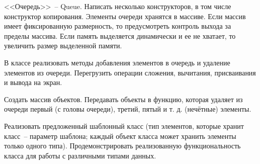 
<<Очередь>>~-- Queue. Написать несколько конструкторов, в том числе конструктор
копирования. Элементы очереди хранятся в массиве. Если массив имеет фиксированную
размерность, то предусмотреть контроль выхода за пределы массива. Если память
выделяется динамически и ее не хватает, то увеличить размер выделенной памяти.

В
классе реализовать методы добавления элементов в очередь и удаление элементов из
очереди. Перегрузить операции сложения, вычитания, присваивания и вывода на экран.

Создать массив объектов. Передавать объекты в функцию, которая удаляет из очереди
первый (с головы очереди), третий, пятый и т. д. (нечётные) элементы.

Реализовать предложенный шаблонный класс (тип элементов, которые
хранит класс~-- параметр шаблона; каждый объект класса может хранить
элементы только одного типа). Продемонстрировать реализованную
функциональность класса для работы с различными типами данных.

